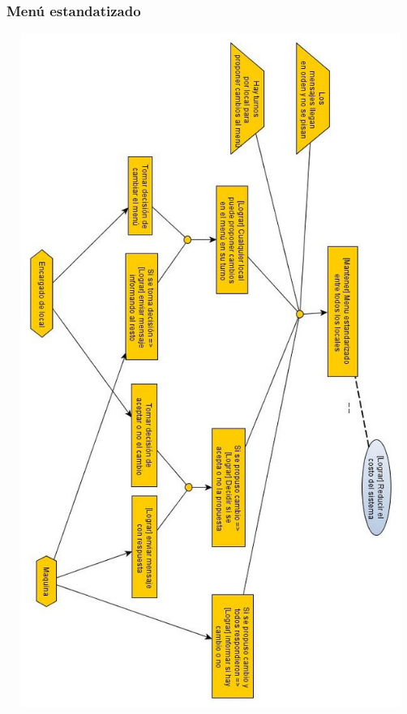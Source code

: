 \documentclass[a4paper,11pt] {article}
\begin{document}
\subsubsection*{Men\'u estandatizado}
\begin{center}
 \includegraphics[height=22cm,width=15cm]{Diagramas/MenuEstandarizado.jpg}
\end{center}
\end{document}
